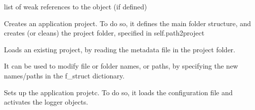 \documentclass[letterpaper,10pt,english]{sphinxmanual}
\begin{document}
\begin{fulllineitems}
\begin{fulllineitems}
\end{fulllineitems}


\begin{fulllineitems}
\label{\detokenize{dc_base_taskmanager:src.base_taskmanager.baseTaskManager.__weakref__}}
\sphinxAtStartPar
list of weak references to the object (if defined)

\end{fulllineitems}


\begin{fulllineitems}
\label{\detokenize{dc_base_taskmanager:src.base_taskmanager.baseTaskManager.create}}
\sphinxAtStartPar
Creates an application project.
To do so, it defines the main folder structure, and creates (or cleans)
the project folder, specified in self.path2project

\end{fulllineitems}


\begin{fulllineitems}
\label{\detokenize{dc_base_taskmanager:src.base_taskmanager.baseTaskManager.load}}
\sphinxAtStartPar
Loads an existing project, by reading the metadata file in the project
folder.

\sphinxAtStartPar
It can be used to modify file or folder names, or paths, by specifying
the new names/paths in the f\_struct dictionary.

\end{fulllineitems}


\begin{fulllineitems}
\label{\detokenize{dc_base_taskmanager:src.base_taskmanager.baseTaskManager.setup}}
\sphinxAtStartPar
Sets up the application projetc. To do so, it loads the configuration
file and activates the logger objects.

\end{fulllineitems}


\end{fulllineitems}
\end{document}
